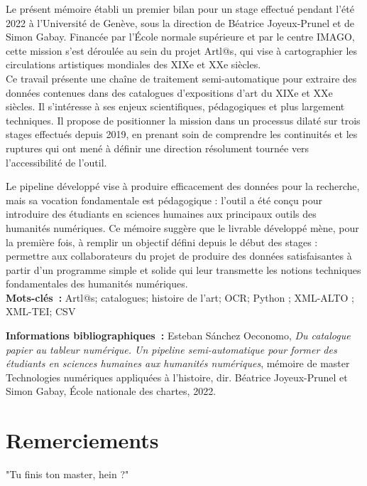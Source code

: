 \documentclass[a4paper,12pt,twoside]{book}
\begin{document}
\medskip

Le présent mémoire établi un premier bilan pour un stage effectué pendant l'été 2022 à l'Université de Genève, sous la direction de Béatrice Joyeux-Prunel et de Simon Gabay. Financée par l'École normale supérieure et par le centre IMAGO, cette mission s'est déroulée au sein du projet Artl@s, qui vise à cartographier les circulations artistiques mondiales des XIXe et XXe siècles.\\

Ce travail présente une chaîne de traitement semi-automatique pour extraire des données contenues dans des catalogues d'expositions d'art du XIXe et XXe siècles. Il s'intéresse à ses enjeux scientifiques, pédagogiques et plus largement techniques. Il propose de positionner la mission dans un processus dilaté sur trois stages effectués depuis 2019, en prenant soin de comprendre les continuités et les ruptures qui ont mené à définir une direction résolument tournée vers l'accessibilité de l'outil.

Le pipeline développé vise à produire efficacement des données pour la recherche, mais sa vocation fondamentale est pédagogique : l'outil a été conçu pour introduire des étudiants en sciences humaines aux principaux outils des humanités numériques. Ce mémoire suggère que le livrable développé mène, pour la première fois, à remplir un objectif défini depuis le début des stages : permettre aux collaborateurs du projet de produire des données satisfaisantes à partir d'un programme simple et solide qui leur transmette les notions techniques fondamentales des humanités numériques.\\



\textbf{Mots-clés~:} Artl@s; catalogues; histoire de l’art; OCR; Python ; XML-ALTO ; XML-TEI; CSV

\textbf{Informations bibliographiques~:} Esteban Sánchez Oeconomo, \textit{Du catalogue papier au tableur numérique. Un pipeline semi-automatique pour former des étudiants en sciences humaines aux humanités numériques}, mémoire de master \og{}Technologies numériques appliquées à l'histoire\fg{}, dir. Béatrice Joyeux-Prunel et Simon Gabay, École nationale des chartes, 2022.

\chapter{Remerciements}


"Tu finis ton master, hein ?"\\
\end{document}
